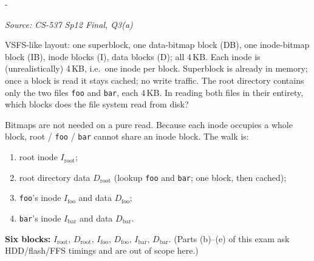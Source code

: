 \documentclass[11pt,a4paper]{article}
\makeatletter
\newcommand{\keepspace}[1]{\par\penalty-100\begingroup
  \setlength{\dimen@}{#1}\dimen@ii\pagegoal\advance\dimen@ii-\pagetotal
  \ifdim\dimen@>\dimen@ii\ifdim\dimen@ii>\z@\vfil\fi\break\fi\endgroup}
\newcounter{qn}[section]
\newenvironment{Qn}[4]{%
  \refstepcounter{qn}\keepspace{7\baselineskip}%
  \begin{tcolorbox}[qboxstyle, title={Q\thesection.\theqn\ \ [#1 \textbar\ #2]\ \ #4}]%
  {\footnotesize\color{g3}\textit{Source: #3}}\par\smallskip%
}{%
  \end{tcolorbox}%
}
\newenvironment{Sol}{%
  \begin{tcolorbox}[sboxstyle, title={Solution}]%
}{%
  \end{tcolorbox}\vspace{0.35em}%
}
\makeatother
\begin{document}
\begin{Qn}{Medium-Hard}{Lect 24}{CS-537 Sp12 Final, Q3(a)}{Which VSFS blocks are read for two root files?}
VSFS-like layout: one superblock, one data-bitmap block (DB), one inode-bitmap
block (IB), inode blocks (I), data blocks (D); all 4\,KB. Each inode is
(unrealistically) 4\,KB, i.e.\ one inode per block. Superblock is already in
memory; once a block is read it stays cached; no write traffic. The root
directory contains only the two files \texttt{foo} and \texttt{bar}, each
4\,KB. In reading both files in their entirety, which blocks does the file
system read from disk?
\end{Qn}
\begin{Sol}
Bitmaps are not needed on a pure read. Because each inode occupies a whole
block, root / \texttt{foo} / \texttt{bar} cannot share an inode block.
The walk is:
\begin{enumerate}
\item root inode $I_{\mathrm{root}}$;
\item root directory data $D_{\mathrm{root}}$ (lookup \texttt{foo} and
      \texttt{bar}; one block, then cached);
\item \texttt{foo}'s inode $I_{\mathrm{foo}}$ and data $D_{\mathrm{foo}}$;
\item \texttt{bar}'s inode $I_{\mathrm{bar}}$ and data $D_{\mathrm{bar}}$.
\end{enumerate}
\textbf{Six blocks:}
$I_{\mathrm{root}}$, $D_{\mathrm{root}}$, $I_{\mathrm{foo}}$,
$D_{\mathrm{foo}}$, $I_{\mathrm{bar}}$, $D_{\mathrm{bar}}$.
(Parts (b)--(e) of this exam ask HDD/flash/FFS timings and are out of
scope here.)
\end{Sol}
\end{document}
